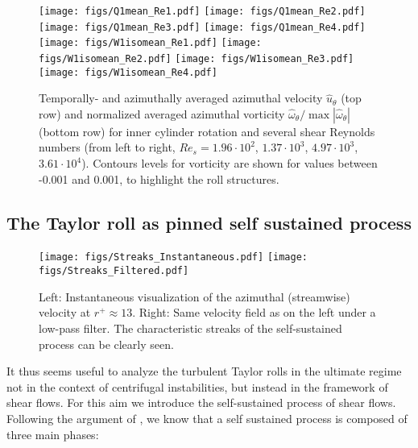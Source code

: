 \documentclass{jfm}
\begin{document}
\begin{figure}
\texttt{[image: figs/Q1mean\_Re1.pdf]}
\texttt{[image: figs/Q1mean\_Re2.pdf]}
\texttt{[image: figs/Q1mean\_Re3.pdf]}
\texttt{[image: figs/Q1mean\_Re4.pdf]}\\
\texttt{[image: figs/W1isomean\_Re1.pdf]}
\texttt{[image: figs/W1isomean\_Re2.pdf]}
\texttt{[image: figs/W1isomean\_Re3.pdf]}
\texttt{[image: figs/W1isomean\_Re4.pdf]}\\
\centering
\caption{Temporally- and azimuthally averaged azimuthal velocity $\hat{u}_\theta$ (top row) and normalized averaged azimuthal vorticity $\hat{\omega}_\theta/\max |\hat{\omega}_\theta|$ (bottom row) for inner cylinder rotation and several shear Reynolds numbers (from left to right, $Re_s=1.96\cdot 10^2$, $1.37\cdot10^3$, $4.97\cdot10^3$, $3.61\cdot10^4$). Contours levels for vorticity are shown for values between -0.001 and 0.001, to highlight the roll structures.  }
\label{fi:avgvelsvorts} 
\end{figure}

\subsection{The Taylor roll as pinned self sustained process}

\begin{figure}
\texttt{[image: figs/Streaks\_Instantaneous.pdf]}
\texttt{[image: figs/Streaks\_Filtered.pdf]}
\centering
\caption{Left: Instantaneous visualization of the azimuthal (streamwise) velocity at $r^+\approx 13$. Right: Same velocity field as on the left under a low-pass filter. The characteristic streaks of the self-sustained process can be clearly seen. }
\label{fi:inststreaks} 
\end{figure}



It thus seems useful to analyze the turbulent Taylor rolls in the ultimate regime not in the context of centrifugal instabilities, but instead in the framework of shear flows. For this aim we introduce the self-sustained process of shear flows. Following the argument of \cite{Wal97}, we know that a self sustained process is composed of three main phases:
\end{document}
